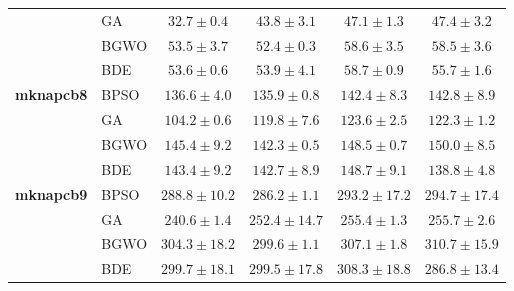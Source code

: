 \begin{table}[htbp]
\begin{tabular*}{\textwidth}{@{\extracolsep{\fill}}llcccc@{}}
                       & GA    &  $\mathbf{32.7 \pm 0.4}$ &           $43.8 \pm 3.1$ &           $47.1 \pm 1.3$ &           $47.4 \pm 3.2$ \\
                       & BGWO  &           $53.5 \pm 3.7$ &  $\mathbf{52.4 \pm 0.3}$ &           $58.6 \pm 3.5$ &           $58.5 \pm 3.6$ \\
                       & BDE   &  $\mathbf{53.6 \pm 0.6}$ &           $53.9 \pm 4.1$ &           $58.7 \pm 0.9$ &           $55.7 \pm 1.6$ \\
    \midrule
    \textbf{mknapcb8}  & BPSO  &          $136.6 \pm 4.0$ & $\mathbf{135.9 \pm 0.8}$ &          $142.4 \pm 8.3$ &          $142.8 \pm 8.9$ \\
                       & GA    & $\mathbf{104.2 \pm 0.6}$ &          $119.8 \pm 7.6$ &          $123.6 \pm 2.5$ &          $122.3 \pm 1.2$ \\
                       & BGWO  &          $145.4 \pm 9.2$ & $\mathbf{142.3 \pm 0.5}$ &          $148.5 \pm 0.7$ &          $150.0 \pm 8.5$ \\
                       & BDE   &          $143.4 \pm 9.2$ &          $142.7 \pm 8.9$ &          $148.7 \pm 9.1$ & $\mathbf{138.8 \pm 4.8}$ \\
    \midrule
    \textbf{mknapcb9}  & BPSO  &         $288.8 \pm 10.2$ & $\mathbf{286.2 \pm 1.1}$ &         $293.2 \pm 17.2$ &         $294.7 \pm 17.4$ \\
                       & GA    & $\mathbf{240.6 \pm 1.4}$ &         $252.4 \pm 14.7$ &          $255.4 \pm 1.3$ &          $255.7 \pm 2.6$ \\
                       & BGWO  &         $304.3 \pm 18.2$ & $\mathbf{299.6 \pm 1.1}$ &          $307.1 \pm 1.8$ &         $310.7 \pm 15.9$ \\
                       & BDE   &         $299.7 \pm 18.1$ &         $299.5 \pm 17.8$ &         $308.3 \pm 18.8$ & $\mathbf{286.8 \pm 13.4}$ \\
    \bottomrule
  \end{tabular*}
\end{table}
